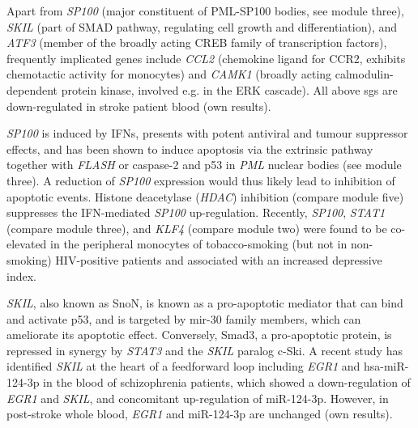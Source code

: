 Apart from \emph{SP100} (major constituent of PML-SP100 bodies, see module three), \emph{SKIL} (part of SMAD pathway, regulating cell growth and differentiation), and \emph{ATF3} (member of the broadly acting CREB family of transcription factors), frequently implicated genes include \emph{CCL2} (chemokine ligand for CCR2, exhibits chemotactic activity for monocytes\cite{Zhang1994}) and \emph{CAMK1} (broadly acting calmodulin-dependent protein kinase, involved e.g. in the ERK cascade). All above \acp{sg} are down-regulated in stroke patient blood (own results).

\emph{SP100} is induced by IFNs, presents with potent antiviral and tumour suppressor effects, and has been shown to induce apoptosis via the extrinsic pathway together with \emph{FLASH} or caspase-2 and p53 in \emph{PML} nuclear bodies (see module three).\cite{Sanchez-Pulido2007} A reduction of \emph{SP100} expression would thus likely lead to inhibition of apoptotic events. Histone deacetylase (\emph{HDAC}) inhibition (compare module five) suppresses the IFN-mediated \emph{SP100} up-regulation.\cite{Vlasakova2007} Recently, \emph{SP100}, \emph{STAT1} (compare module three), and \emph{KLF4} (compare module two) were found to be co-elevated in the peripheral monocytes of tobacco-smoking (but not in non-smoking) HIV-positive patients and associated with an increased depressive index.\cite{Lorenz2019}

\emph{SKIL}, also known as SnoN, is known as a pro-apoptotic mediator that can bind and activate p53, and is targeted by mir-30 family members, which can ameliorate its apoptotic effect.\cite{Kim2018} Conversely, Smad3, a pro-apoptotic protein, is repressed in synergy by \emph{STAT3} and the \emph{SKIL} paralog c-Ski.\cite{Makino2017} A recent study has identified \emph{SKIL} at the heart of a feedforward loop including \emph{EGR1} and hsa-miR-124-3p in the blood of schizophrenia patients, which showed a down-regulation of \emph{EGR1} and \emph{SKIL}, and concomitant up-regulation of miR-124-3p.\cite{Xu2016} However, in post-stroke whole blood, \emph{EGR1} and miR-124-3p are unchanged (own results).

